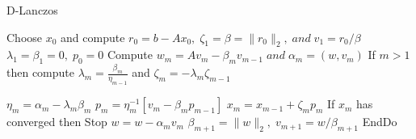 \documentclass[10pt,a4paper]{article}
\begin{document}
\begin{algorithm}
\caption{D-Lanczos}
\begin{algorithmic}[1]
\State Choose $x_0$ and compute $r_0=b-Ax_0,\;\zeta_1=\beta=\|r_0\|_2,\;and\;v_1=r_0/\beta$
\State $\lambda_1=\beta_1=0,\;p_0=0$
	\State Compute $w_m = Av_m-\beta_mv_{m-1}\;and\;\alpha_m=(w,v_m)$
	\State If $m > 1$ then compute $\lambda_m=\frac{\beta_m}{\eta_{m-1}}$ and $\zeta_m=-\lambda_m\zeta_{m-1}$
	
	\State $\eta_m=\alpha_m-\lambda_m\beta_m$
	\State $p_m = \eta^{-1}_m[v_m-\beta_mp_{m-1}]$
	\State $x_m=x_{m-1}+\zeta_mp_m$
	\State If $x_m$ has converged then Stop
	\State $w=w-\alpha_mv_m$
	\State $\beta_{m+1}=\|w\|_2,\;v_{m+1}=w/\beta_{m+1}$
\EndFor
\State EndDo
\end{algorithmic}
\end{algorithm}
\end{document}
